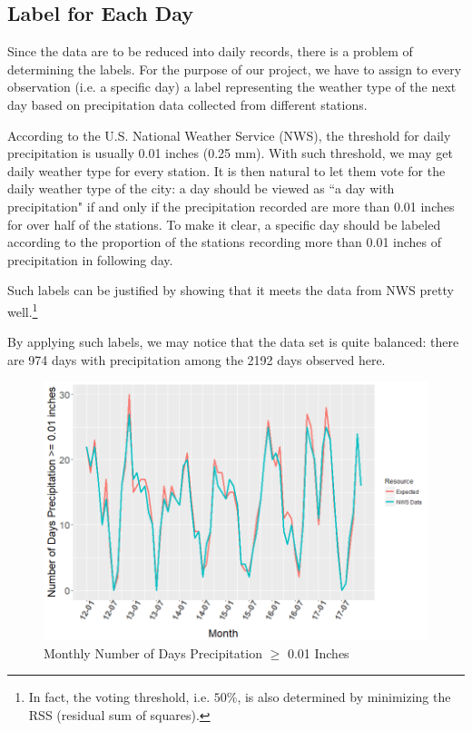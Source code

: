 \subsection{Label for Each Day}

Since the data are to be reduced into daily records, there is a problem of determining the labels. For the purpose of our project, we have to assign to every observation (i.e. a specific day) a label representing the weather type of the next day based on precipitation data collected from different stations.

According to the U.S. National Weather Service (NWS), the threshold for daily precipitation is usually 0.01 inches (0.25 mm). With such threshold, we may get daily weather type for every station. It is then natural to let them vote for the daily weather type of the city: a day should be viewed as ``a day with precipitation" if and only if the precipitation recorded are more than 0.01 inches for over half of the stations. To make it clear, a specific day should be labeled according to the proportion of the stations recording more than 0.01 inches of precipitation in following day.

Such labels can be justified by showing that it meets the data from NWS pretty well.\footnote{In fact, the voting threshold, i.e. $50\%$, is also determined by minimizing the RSS (residual sum of squares).}

By applying such labels, we may notice that the data set is quite balanced: there are 974 days with precipitation among the 2192 days observed here.

\begin{figure}[h]
\center\includegraphics[width = .7\textwidth]{rainyday.png}
\caption{Monthly Number of Days Precipitation \(\geq\) 0.01 Inches}
\label{rainyday}
\end{figure}